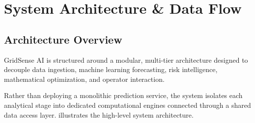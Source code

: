 \section{System Architecture \& Data Flow}
\label{sec:system_architecture}

\subsection{Architecture Overview}
\label{subsec:architecture_overview}

GridSense AI is structured around a modular, multi-tier architecture designed to decouple data ingestion, machine learning forecasting, risk intelligence, mathematical optimization, and operator interaction. 

Rather than deploying a monolithic prediction service, the system isolates each analytical stage into dedicated computational engines connected through a shared data access layer.  illustrates the high-level system architecture.

